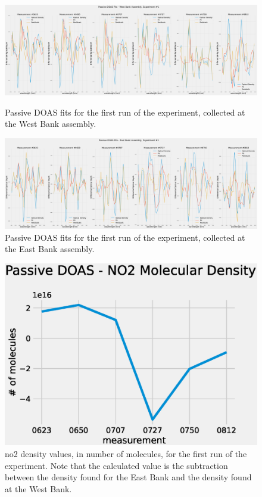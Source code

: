 \begin{figure}
    \centering
    \includegraphics[width = .82\textheight]{img/eps/fit_passive_westbank_exp1.eps}
    \caption{Passive \gls{DOAS} fits for the first run of the
    experiment, collected at the West Bank assembly.}
    \label{fig:exp1_fit_west}

    \includegraphics[width=.82\textheight]{img/eps/fit_passive_eastbank_exp1.eps}
    \caption{Passive \gls{DOAS} fits for the first run of the
    experiment, collected at the East Bank assembly.}
    \label{fig:exp1_fit_east}
\end{figure}

\begin{figure}[htpb]
    \centering
    \includegraphics[width=0.8\linewidth]{img/eps/no2_passive_density_exp1.eps}
    \caption{\gls{no2} density values, in number of molecules, for the
    first run of the experiment. Note that the calculated value is the
    subtraction between the density found for the East Bank and the density
    found at the West Bank.}
    \label{fig:exp1_no2_density}
\end{figure}


